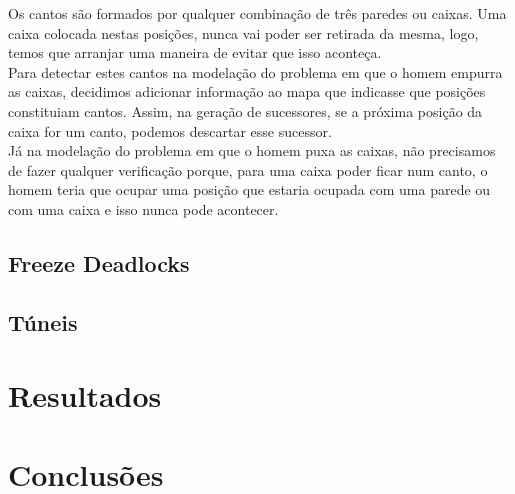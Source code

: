 \documentclass[twocolumn]{article}
\begin{document}
Os cantos são formados por qualquer combinação de três paredes ou caixas. Uma caixa colocada nestas posições, nunca vai poder ser retirada da mesma, logo, temos que arranjar uma maneira de evitar que isso aconteça. \\
Para detectar estes cantos na modelação do problema em que o homem empurra as caixas, decidimos adicionar informação ao mapa que indicasse que posições constituiam cantos. Assim, na geração de sucessores, se a próxima posição da caixa for um canto, podemos descartar esse sucessor. \\
Já na modelação do problema em que o homem puxa as caixas, não precisamos de fazer qualquer verificação porque, para uma caixa poder ficar num canto, o homem teria que ocupar uma posição que estaria ocupada com uma parede ou com uma caixa e isso nunca pode acontecer.

\subsection{Freeze Deadlocks}

\subsection{Túneis}


\section{Resultados}

\section{Conclusões}
\end{document}
